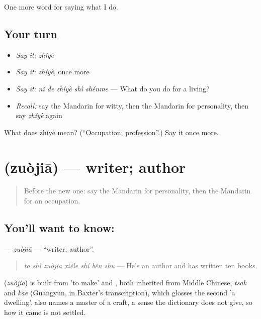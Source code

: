 \begin{grammarlens}[title={What you've built}]
One more word for saying what I do.
\end{grammarlens}

\subsection*{Your turn}
\begin{itemize}
\raggedright
  \item \emph{Say it:} \emph{zhíyè}
  \item \emph{Say it:} \emph{zhíyè}, once more
  \item \emph{Say it:} \emph{nǐ de zhíyè shì shénme} — What do you do for a living?
  \item \emph{Recall:} say the Mandarin for witty, then the Mandarin for personality, then say \emph{zhíyè} again
\end{itemize}

\begin{tcolorbox}[breakable,colback=teal!4,colframe=teal!35!black,title={Before you move on}]
What does zhíyè mean? (\textquotedblleft{}Occupation; profession\textquotedblright{}.) Say it once more.
\end{tcolorbox}
\section[\texorpdfstring{\zh{作家} (zuòjiā)}{作家 (zuòjiā)}]{ (zuòjiā) — writer; author}

\label{lesson:ZH-C259-zuojia}



\begin{quote}
Before the new one: say the Mandarin for personality, then the Mandarin for an occupation.
\end{quote}

\subsection*{You'll want to know: }
\textbf{} — \emph{zuòjiā} — \textquotedblleft{}writer; author\textquotedblright{}.

\begin{quote}
\textbf{} \emph{tā shì zuòjiā xiěle shí běn shū} — He's an author and has written ten books.
\end{quote}

\begin{cousinweb}
\textbf{} (\emph{zuòjiā}) is built from  'to make' and , both inherited from Middle Chinese, \emph{tsak} and \emph{kae} (Guangyun, in Baxter's transcription), which glosses the second 'a dwelling'.  also names a master of a craft, a sense the dictionary does not give, so how it came is not settled.
\end{cousinweb}

